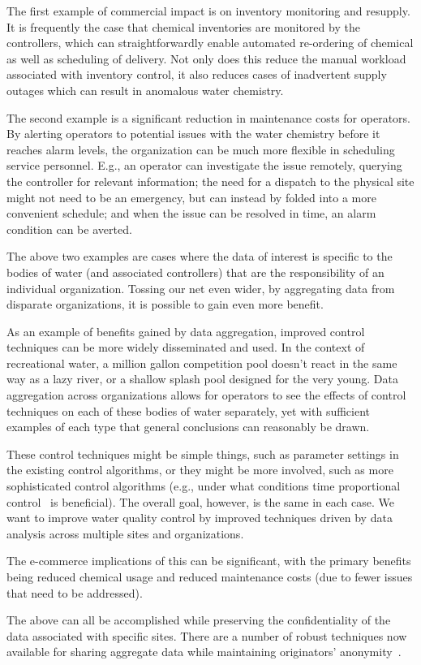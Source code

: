 The first example of commercial impact is on inventory monitoring
and resupply. It is frequently the case that chemical inventories
are monitored by the controllers, which can straightforwardly enable
automated re-ordering of chemical as well as scheduling of delivery.
Not only does this reduce the manual workload associated with
inventory control, it also reduces cases of inadvertent supply outages
which can result in anomalous water chemistry.

The second example is a significant reduction in maintenance costs
for operators.  By alerting operators to potential
issues with the water chemistry before it reaches alarm levels, 
the organization can be much more flexible in scheduling service
personnel. E.g., an operator can investigate the issue remotely,
querying the controller for relevant information; the need for
a dispatch to the physical site might not need to be an emergency, but can
instead by folded into a more convenient schedule; and when the
issue can be resolved in time, an alarm condition can be averted.

The above two examples are cases where the data of interest is specific
to the bodies of water (and associated controllers) that are the
responsibility of an individual organization.  Tossing our net
even wider, by aggregating data from disparate organizations, it
is possible to gain even more benefit.

As an example of benefits gained by data aggregation, improved
control techniques can be more widely disseminated and used.
In the context of recreational water, a million gallon competition
pool doesn't react in the same way as a lazy river, or a shallow
splash pool designed for the very young. Data aggregation across
organizations allows for operators to see the effects of control
techniques on each of these bodies of water separately, yet with
sufficient examples of each type that general conclusions can
reasonably be drawn.

These control techniques might be simple things, such as parameter
settings in the existing control algorithms, or they might be
more involved, such as more sophisticated control algorithms
(e.g., under what conditions time proportional control~\cite{McP13}
is beneficial). The overall goal, however, is the same in each
case. We want to improve water quality control by improved techniques
driven by data analysis across multiple sites and organizations.

The e-commerce implications of this can be significant, with the
primary benefits being reduced chemical usage and reduced maintenance
costs (due to fewer issues that need to be addressed).

The above can all be accomplished while preserving the confidentiality
of the data associated with specific sites.  There are a number
of robust techniques now available for sharing aggregate data
while maintaining originators' anonymity~\cite{horey2007,zhong2009k}.

